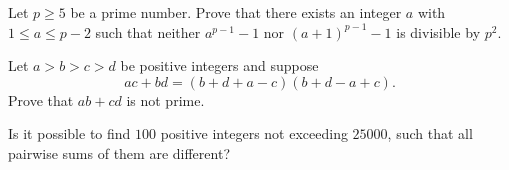 \begin{problem}[ISL 2001/N4]
  Let $p\ge 5$ be a prime number. Prove that there exists an integer $a$ with
  $1\le a\le p-2$ such that neither $a^{p-1}-1$ nor $(a+1)^{p-1}-1$ is divisible
  by $p^2$.
\end{problem}

\begin{problem}[ISL 2001/N5]
  Let $a>b>c>d$ be positive integers and suppose
  \[ac+bd=(b+d+a-c)(b+d-a+c).\]
  Prove that $ab+cd$ is not prime.
\end{problem}

\begin{problem}[ISL 2001/N6]
  Is it possible to find $100$ positive integers not exceeding $25000$, such
  that all pairwise sums of them are different?
\end{problem}
